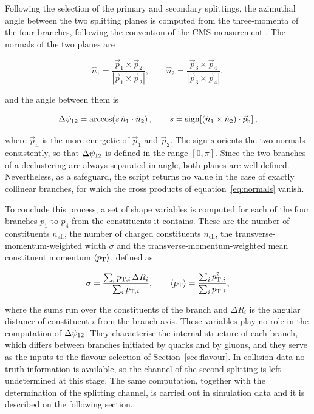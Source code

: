 Following the selection of the primary and secondary splittings, the azimuthal angle between
the two splitting planes is computed from the three-momenta of the four branches,
following the convention of the CMS measurement \cite{CMS:2026jnt}. The normals of the two planes
are

\begin{equation}
  \hat{n}_1 = \frac{\vec{p}_1 \times \vec{p}_2}{|\vec{p}_1 \times \vec{p}_2|},
  \qquad
  \hat{n}_2 = \frac{\vec{p}_3 \times \vec{p}_4}{|\vec{p}_3 \times \vec{p}_4|},
  \label{eq:normals}
\end{equation}

and the angle between them is

\begin{equation}
  \Delta\psi_{12} = \arccos\!\left( s \, \hat{n}_1 \cdot \hat{n}_2 \right),
  \qquad
  s = \operatorname{sign}\!\left[ (\hat{n}_1 \times \hat{n}_2) \cdot
      \vec{p}_{\mathrm{h}} \right],
  \label{eq:dpsi-impl}
\end{equation}

where $\vec{p}_{\mathrm{h}}$ is the more energetic of $\vec{p}_1$ and
$\vec{p}_2$. The sign $s$ orients the two normals consistently, so that $\Delta\psi_{12}$
is defined in the range $[0, \pi]$. Since the two branches of a declustering are always separated in angle, both
planes are well defined. Nevertheless, as a safeguard, the script returns no value in the
case of exactly collinear branches, for which the cross products of
equation~\eqref{eq:normals} vanish.

To conclude this process, a set of shape variables is computed for each of the four branches
$p_1$ to $p_4$ from the constituents it contains. These are the number of
constituents $n_{\text{all}}$, the number of charged constituents
$n_{\text{ch}}$, the transverse-momentum-weighted width $\sigma$ and the
transverse-momentum-weighted mean constituent momentum $\langle p_{\mathrm{T}} \rangle$,
defined as

\begin{equation}
  \sigma = \frac{\sum_i p_{\mathrm{T},i}\,\Delta R_i}{\sum_i p_{\mathrm{T},i}},
  \qquad
  \langle p_{\mathrm{T}} \rangle = \frac{\sum_i p_{\mathrm{T},i}^{2}}{\sum_i p_{\mathrm{T},i}},
  \label{eq:shapes}
\end{equation}

where the sums run over the constituents of the branch and $\Delta R_i$ is the
angular distance of constituent $i$ from the branch axis. These variables play no role
in the computation of $\Delta\psi_{12}$. They characterise the internal structure of
each branch, which differs between branches initiated by quarks and by gluons, and
they serve as the inputs to the flavour selection of Section~\ref{sec:flavour}. In collision
data no truth information is available, so the channel of the second splitting is left undetermined
at this stage. The same computation, together with the determination of the splitting channel, is 
carried out in simulation data and it is described on the following section.

